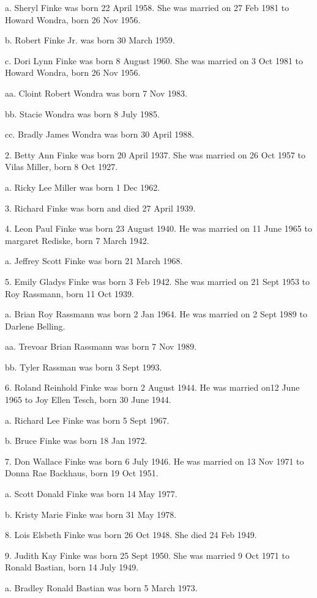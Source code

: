 \documentclass[a4paper]{article}
\begin{document}
a. Sheryl Finke was born 22 April 1958.  She was married on 27 Feb 1981 to Howard Wondra, born 26 Nov 1956.

b. Robert Finke Jr. was born 30 March 1959.

c. Dori Lynn Finke was born 8 August 1960.  She was married on 3 Oct 1981 to Howard Wondra, born 26 Nov 1956.  

aa. Cloint Robert Wondra was born 7 Nov 1983.

bb. Stacie Wondra was born 8 July 1985.

cc. Bradly James Wondra was born 30 April 1988.

2. Betty Ann Finke was born 20 April  1937.  She was married on 26 Oct 1957 to Vilas Miller, born 8 Oct 1927.

a. Ricky Lee Miller was born 1 Dec 1962.

3. Richard Finke was born and died 27 April 1939.

4. Leon Paul Finke was born 23 August 1940.  He was married on 11 June 1965 to margaret Rediske, born 7 March 1942.

a. Jeffrey Scott Finke was born 21 March 1968.

5. Emily Gladys Finke was born 3 Feb 1942.  She was married on 21 Sept 1953 to Roy Rassmann, born 11 Oct 1939. 

a. Brian Roy Rassmann was born 2 Jan 1964.  He was married on 2 Sept 1989 to Darlene Belling.

aa. Trevoar Brian Rassmann was born 7 Nov 1989.

bb. Tyler Rassman was born 3 Sept 1993.

6. Roland Reinhold Finke was born 2 August 1944.  He was married on12 June 1965 to Joy Ellen Tesch, born 30 June 1944.

a. Richard Lee Finke was born 5 Sept 1967.

b. Bruce Finke was born 18 Jan 1972.

7. Don Wallace Finke was born 6 July 1946.  He was married on 13 Nov 1971 to Donna Rae Backhaus, born 19 Oct 1951.

a. Scott Donald Finke was born 14 May 1977.

b. Kristy Marie Finke was born 31 May 1978.

8. Lois Elsbeth Finke was born 26 Oct 1948.  She died 24 Feb 1949.

9. Judith Kay Finke was born 25 Sept 1950.  She was married 9 Oct 1971 to Ronald Bastian, born 14 July 1949.

a. Bradley Ronald Bastian was born 5 March 1973.
\end{document}
